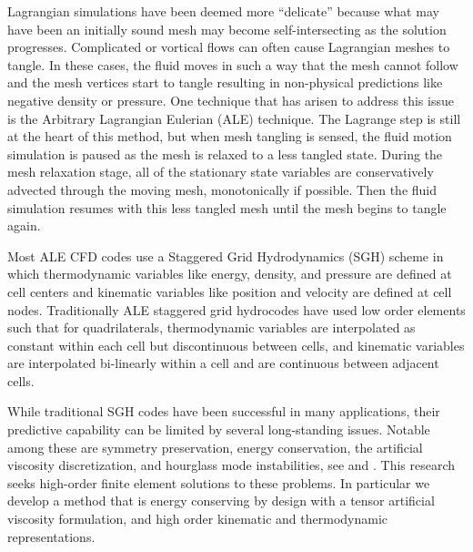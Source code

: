 Lagrangian simulations have been deemed more ``delicate'' because what may have been an initially sound mesh may become self-intersecting as the solution progresses. Complicated or vortical flows can often cause Lagrangian meshes to tangle. In these cases, the fluid moves in such a way that the mesh cannot follow and the mesh vertices start to tangle resulting in non-physical predictions like negative density or pressure. One technique that has arisen to address this issue is the Arbitrary Lagrangian Eulerian \cite{DonaeALE} (ALE) technique. The Lagrange step \cite{Tipton90} is still at the heart of this method, but when mesh tangling is sensed, the fluid motion simulation is paused as the mesh is relaxed to a less tangled state. During the mesh relaxation stage, all of the stationary state variables are conservatively advected through the moving mesh, monotonically if possible. Then the fluid simulation resumes with this less tangled mesh until the mesh begins to tangle again.

Most ALE CFD codes use a Staggered Grid Hydrodynamics \cite{Burton1994} (SGH) scheme in which thermodynamic variables like energy, density, and pressure are defined at cell centers and kinematic variables like position and velocity are defined at cell nodes. Traditionally ALE staggered grid hydrocodes have used low order elements such that for quadrilaterals, thermodynamic variables are interpolated as constant within each cell but discontinuous between cells, and kinematic variables are interpolated bi-linearly within a cell and are continuous between adjacent cells.

While traditional SGH codes have been successful in many applications, their predictive capability can be limited by several long-standing issues. Notable among these are symmetry preservation, energy conservation, the artificial viscosity discretization, and hourglass mode instabilities, see  and . This research seeks high-order finite element solutions to these problems. In particular we develop a method that is energy conserving by design with a tensor artificial viscosity formulation, and high order kinematic and thermodynamic representations.

